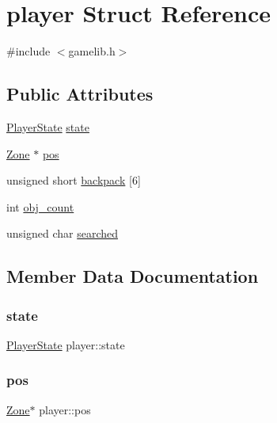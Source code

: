 \hypertarget{structplayer}{}\section{player Struct Reference}
\label{structplayer}


{\ttfamily \#include $<$gamelib.\+h$>$}

\subsection*{Public Attributes}
\begin{DoxyCompactItemize}
\item 
\hyperlink{gamelib_8h_a3c730f37b1b3a893159bada67637fdb1}{Player\+State} \hyperlink{structplayer_a7a12243ddd44d5db7ebe3b510bc15df6}{state}
\item 
\hyperlink{group__map_ga25bd5049e352284b30a6a239fa772249}{Zone} $\ast$ \hyperlink{structplayer_a0db8d5cf8649e05397bf709d0f2dff87}{pos}
\item 
unsigned short \hyperlink{structplayer_a8d5595c727db605ca67db92df02bfc86}{backpack} \mbox{[}6\mbox{]}
\item 
int \hyperlink{structplayer_a8cf792a21c4f21d1b625abe9fcf65cf2}{obj\+\_\+count}
\item 
unsigned char \hyperlink{structplayer_a23a60ae030319477cc975d0d8fa9d4f8}{searched}
\end{DoxyCompactItemize}


\subsection{Member Data Documentation}
\mbox{\label{structplayer_a7a12243ddd44d5db7ebe3b510bc15df6}} 
\subsubsection{\texorpdfstring{state}{state}}
{\footnotesize\ttfamily \hyperlink{gamelib_8h_a3c730f37b1b3a893159bada67637fdb1}{Player\+State} player\+::state}

\mbox{\label{structplayer_a0db8d5cf8649e05397bf709d0f2dff87}} 
\subsubsection{\texorpdfstring{pos}{pos}}
{\footnotesize\ttfamily \hyperlink{group__map_ga25bd5049e352284b30a6a239fa772249}{Zone}$\ast$ player\+::pos}

